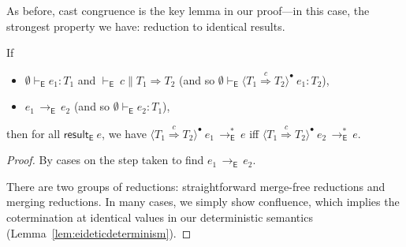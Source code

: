 \documentclass[9pt]{extarticle}
\newcommand{\ottnt}[1]{\mathit{#1}}
\begin{document}
As before, cast congruence is the key lemma in our proof---in this
case, the strongest property we have: reduction to identical results.

\begin{lemma}
  \label{lem:eideticcastcongruencesinglestep}
  If
  \begin{itemize}
  \item $ \emptyset   \vdash _{  \mathsf{E}  }  \ottnt{e_{{\mathrm{1}}}}  :  \ottnt{T_{{\mathrm{1}}}} $ and $ \mathord{  \vdash _{  \mathsf{E}  } }~ \ottnt{c}   \mathrel{\parallel}   \ottnt{T_{{\mathrm{1}}}}  \Rightarrow  \ottnt{T_{{\mathrm{2}}}} $ (and so
    $ \emptyset   \vdash _{  \mathsf{E}  }   \langle  \ottnt{T_{{\mathrm{1}}}}  \mathord{ \overset{ \ottnt{c} }{\Rightarrow} }  \ottnt{T_{{\mathrm{2}}}}  \rangle^{\bullet} ~  \ottnt{e_{{\mathrm{1}}}}   :  \ottnt{T_{{\mathrm{2}}}} $),
  \item $\ottnt{e_{{\mathrm{1}}}} \,  \longrightarrow _{  \mathsf{E}  }  \, \ottnt{e_{{\mathrm{2}}}}$ (and so $ \emptyset   \vdash _{  \mathsf{E}  }  \ottnt{e_{{\mathrm{2}}}}  :  \ottnt{T_{{\mathrm{1}}}} $),
  \end{itemize}
then for all $ \mathsf{result} _{  \mathsf{E}  }~ \ottnt{e} $, we have $ \langle  \ottnt{T_{{\mathrm{1}}}}  \mathord{ \overset{ \ottnt{c} }{\Rightarrow} }  \ottnt{T_{{\mathrm{2}}}}  \rangle^{\bullet} ~  \ottnt{e_{{\mathrm{1}}}}  \,  \longrightarrow ^{*}_{  \mathsf{E}  }  \, \ottnt{e}$
  iff $ \langle  \ottnt{T_{{\mathrm{1}}}}  \mathord{ \overset{ \ottnt{c} }{\Rightarrow} }  \ottnt{T_{{\mathrm{2}}}}  \rangle^{\bullet} ~  \ottnt{e_{{\mathrm{2}}}}  \,  \longrightarrow ^{*}_{  \mathsf{E}  }  \, \ottnt{e}$.
\begin{proof}
    By cases on the step taken to find $\ottnt{e_{{\mathrm{1}}}} \,  \longrightarrow _{  \mathsf{E}  }  \, \ottnt{e_{{\mathrm{2}}}}$.
{\iffull
      
      There are two groups of reductions: straightforward merge-free
      reductions and merging reductions.
In many cases, we simply show confluence, which implies the
    cotermination at identical values in our deterministic semantics
    (Lemma~\ref{lem:eideticdeterminism}).

}
\end{proof}
\end{lemma}
\end{document}
